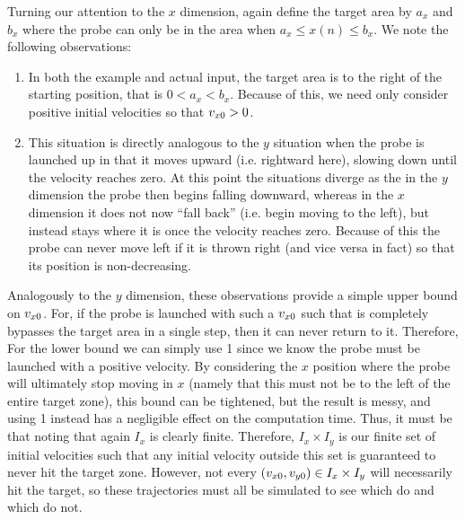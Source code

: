 \documentclass{article}
\begin{document}
{    Turning our attention to the $x$ dimension, again define the target area by $a_x$ and $b_x$ where the probe can only be in the area when $a_x \leq x(n) \leq b_x$.
    We note the following observations:
    \begin{enumerate}
        \item In both the example and actual input, the target area is to the right of the starting position, that is $0 < a_x < b_x$.
        Because of this, we need only consider positive initial velocities so that $v_{x0} > 0$.
        \item This situation is directly analogous to the $y$ situation when the probe is launched up in that it moves upward (i.e. rightward here), slowing down until the velocity reaches zero.
        At this point the situations diverge as the in the $y$ dimension the probe then begins falling downward, whereas in the $x$ dimension it does not now ``fall back'' (i.e. begin moving to the left), but instead stays where it is once the velocity reaches zero.
        Because of this the probe can never move left if it is thrown right (and vice versa in fact) so that its position is non-decreasing.
    \end{enumerate}
    Analogously to the $y$ dimension, these observations provide a simple upper bound on $v_{x0}$.
    For, if the probe is launched with such a $v_{x0}$ such that is completely bypasses the target area in a single step, then it can never return to it.
    Therefore,
    For the lower bound we can simply use 1 since we know the probe must be launched with a positive velocity.
    By considering the $x$ position where the probe will ultimately stop moving in $x$ (namely that this must not be to the left of the entire target zone), this bound can be tightened, but the result is messy, and using 1 instead has a negligible effect on the computation time.
    Thus, it must be that
    noting that again $I_x$ is clearly finite.
    Therefore, $I_x \times I_y$ is our finite set of initial velocities such that any initial velocity outside this set is guaranteed to never hit the target zone.
    However, not every $(v_{x0}, v_{y0}) \in I_x \times I_y$ will necessarily hit the target, so these trajectories must all be simulated to see which do and which do not.
}
\end{document}

